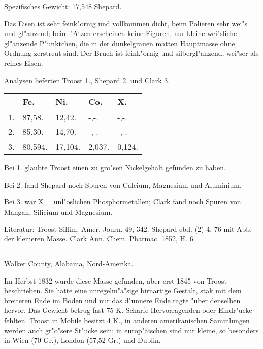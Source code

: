 \documentclass[a4paper, 11pt, oneside]{article}
\begin{document}
Spezifisches Gewicht: 17,548 Shepard.

Das Eisen ist sehr feink"ornig und vollkommen dicht, beim Polieren sehr wei"s und gl"anzend; beim "Atzen erscheinen keine Figuren, nur kleine wei"sliche gl"anzende P"unktchen, die in der dunkelgrauen matten Hauptmasse ohne Ordnung zerstreut sind. Der Bruch ist feink"ornig und silbergl"anzend, wei"ser als reines Eisen.

Analysen lieferten Troost 1., Shepard 2. und Clark 3.
\begin{table}[H]
    \centering\swabfamily\Large
    \begin{tabular}{l l l l l}
         & Fe. & Ni. & Co. & X. \\ \hline
        1. & 87,58. & 12,42. & -,-. & -,-. \\
        2. & 85,30. & 14,70. & -,-. & -,-. \\
        3. & 80,594. & 17,104. & 2,037. & 0,124. \\
    \end{tabular}
\end{table}

Bei 1. glaubte Troost einen zu gro"sen Nickelgehalt gefunden zu haben.

Bei 2. fand Shepard noch Spuren von Calcium, Magnesium und Aluminium.

Bei 3. war X = unl"oslichen Phosphormetallen; Clark fand noch Spuren von Mangan, Silicium und Magnesium.

\normalsize
Literatur: Troost Sillim. Amer. Journ. 49, 342. Shepard ebd. (2) 4, 76 mit Abb. der kleineren Masse. Clark Ann. Chem. Pharmac. 1852, H. 6.

\subsection{}
\LARGE
\paragraph{}
Walker County, Alabama, Nord-Amerika.

Im Herbst 1832 wurde diese Masse gefunden, aber erst 1845 von Troost beschrieben. Sie hatte eine unregelm"a"sige birnartige Gestalt, stak mit dem breiteren Ende im Boden und nur das d"unnere Ende ragte "uber denselben hervor. Das Gewicht betrug fast 75 K. Scharfe Hervorragenden oder Eindr"ucke fehlten. Troost in Mobile besitzt 4 K., in anderen amerikanischen Sammlungen werden auch gr"o"sere St"ucke sein; in europ"aischen sind nur kleine, so besonders in Wien (70 Gr.), London (57,52 Gr.) und Dublin.
\end{document}
